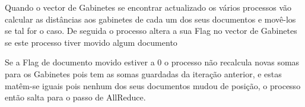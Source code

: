 \documentclass[times, 10pt,twocolumn]{article}
\begin{document}
%
%
%
%
%



Quando o vector de Gabinetes se encontrar actualizado os vários processos vão calcular as distâncias aos gabinetes de cada um dos seus documentos e movê-los se tal for o caso. De seguida o processo altera a sua Flag no vector de Gabinetes se este processo tiver movido algum documento

Se a Flag de documento movido estiver a 0 o processo não recalcula novas somas para os Gabinetes pois tem as somas guardadas da iteração anterior, e estas matêm-se iguais pois nenhum dos seus documentos mudou de posição, o processo então salta para o passo de AllReduce.
\end{document}
